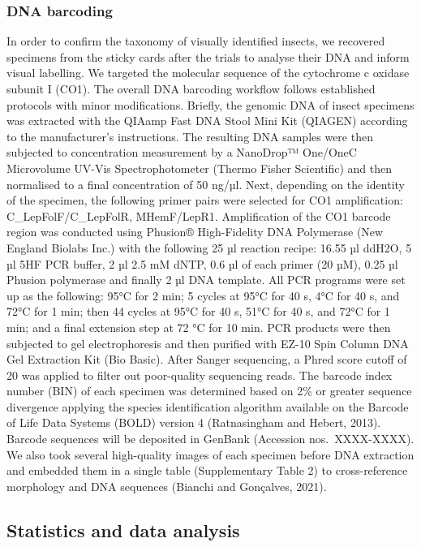 \documentclass[fleqn,10pt]{wlscirep}
\begin{document}
\subsubsection*{DNA barcoding}
In order to confirm the taxonomy of visually identified insects, we recovered specimens from the sticky cards after the trials to analyse their DNA and inform visual labelling. We targeted the molecular sequence of the cytochrome c oxidase subunit I (CO1). The overall DNA barcoding workflow follows established protocols\cite{dewaard_expedited_2018} with minor modifications. Briefly, the genomic DNA of insect specimens was extracted with the QIAamp Fast DNA Stool Mini Kit (QIAGEN) according to the manufacturer’s instructions. The resulting DNA samples were then subjected to concentration measurement by a NanoDrop™ One/OneC Microvolume UV-Vis Spectrophotometer (Thermo Fisher Scientific) and then normalised to a final concentration of 50 ng/µl. Next, depending on the identity of the specimen, the following primer pairs were selected for CO1 amplification: C\_LepFolF/C\_LepFolR\cite{hernandeztriana_recovery_2014}, MHemF/LepR1\cite{park_barcoding_2011}. Amplification of the CO1 barcode region was conducted using Phusion® High-Fidelity DNA Polymerase (New England Biolabs Inc.) with the following 25 µl reaction recipe: 16.55 µl ddH2O, 5 µl 5HF PCR buffer, 2 µl 2.5 mM dNTP, 0.6 µl of each primer (20 µM), 0.25 µl Phusion polymerase and finally 2 µl DNA template. All PCR programs were set up as the following: 95°C for 2 min; 5 cycles at 95°C for 40 s, 4°C for 40 s, and 72°C for 1 min; then 44 cycles at 95°C for 40 s, 51°C for 40 s, and 72°C for 1 min; and a final extension step at 72 °C for 10 min. PCR products were then subjected to gel electrophoresis and then purified with EZ-10 Spin Column DNA Gel Extraction Kit (Bio Basic). After Sanger sequencing, a Phred score cutoff of 20 was applied to filter out poor-quality sequencing reads. 
The barcode index number (BIN) of each specimen was determined based on 2\% or greater sequence divergence applying the species identification algorithm available on the Barcode of Life Data Systems (BOLD) version 4 (Ratnasingham and Hebert, 2013). Barcode sequences will be deposited in GenBank (Accession nos.~XXXX-XXXX). We also took several high-quality images of each specimen before DNA extraction and embedded them in a single table (Supplementary Table 2) to cross-reference morphology and DNA sequences (Bianchi and Gonçalves, 2021).


\subsection*{Statistics and data analysis}
\end{document}
